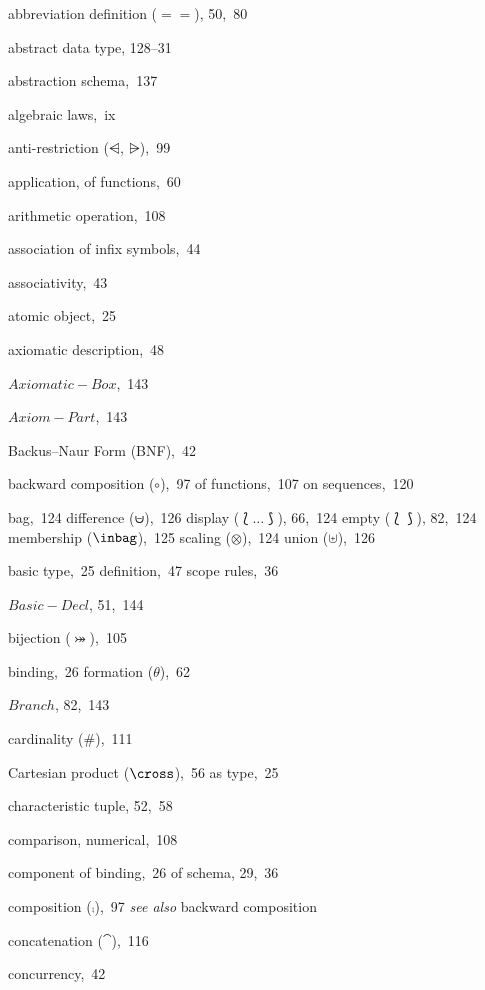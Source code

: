 \begin{theindex}
\item abbreviation definition ($==$), 50,~80
\item abstract data type, 128--31
\item abstraction schema,~137
\item algebraic laws,~ix
\item anti-restriction ($\ndres$, $\nrres$),~99
\item application, of functions,~60
\item arithmetic operation,~108
\item association of infix symbols,~44
\item associativity,~43
\item atomic object,~25
\item axiomatic description,~48
\item \(Axiomatic-Box\),~143
\item \(Axiom-Part\),~143
\indexspace %
\item Backus--Naur Form (BNF),~42
\item backward composition ($\circ$),~97
  \subitem of functions,~107
  \subitem on sequences,~120
\item bag,~124
  \subitem difference ($\uminus$),~126
  \subitem display ($\lbag\ldots\rbag$), 66,~124
  \subitem empty ($\lbag\rbag$), 82,~124
  \subitem membership ($\inbag$),~125
  \subitem scaling ($\otimes$),~124
  \subitem union ($\uplus$),~126
\item basic type,~25
  \subitem definition,~47
  \subitem scope rules,~36
\item \(Basic-Decl\), 51,~144
\item bijection ($\bij$),~105
\item binding,~26
  \subitem formation ($\theta$),~62
\item \(Branch\), 82,~143
\indexspace %
\item cardinality ($\#$),~111
\item Cartesian product ($\cross$),~56
  \subitem as type,~25
\item characteristic tuple, 52,~58
\item comparison, numerical,~108
\item component
  \subitem of binding,~26
  \subitem of schema, 29,~36
\item composition ($\comp$),~97 {\em see also\/} backward composition
\item concatenation ($\cat$),~116
\item concurrency,~42

\end{theindex}
